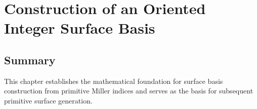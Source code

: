 \chapter{Construction of an Oriented Integer Surface Basis}
\label{chap:m001}




\section{Summary}
This chapter establishes the mathematical foundation for surface basis
construction from primitive Miller indices and serves as the basis for
subsequent primitive surface generation.
